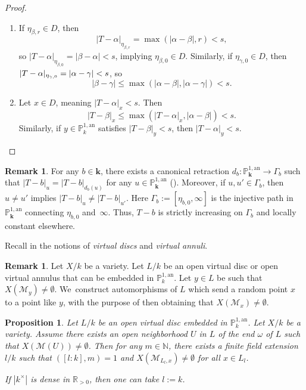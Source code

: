 \documentclass[JEP,XML,SOM,Unicode,NoFloatCountersInSection,published]{cedram}
\newcommand{\bbk}{{\boldsymbol{k}}}%
\newtheorem{prop}[thm]{Proposition}
\theoremstyle{definition}
\newtheorem{rem}[thm]{Remark}
\begin{document}
\pagebreak[2]
\skpt
\begin{proof}
\begin{enumerate}
\item
If $\eta_{\beta, r} \in D$, then
\[
|T-\alpha|_{\eta_{\beta, r}}=\max(|\alpha-\beta|, r)<s,
\]
so ${|T-\alpha|_{\eta_{\beta, 0}}=|\beta-\alpha|<s}$, implying $\eta_{\beta, 0} \in D$.
Similarly, if $\eta_{\gamma,0} \in D$, then $|T-\nobreak\alpha|_{\eta_{\gamma, 0}}=|\alpha-\gamma|<s$, so
\[
|\beta-\gamma|\leqslant \max(|\alpha-\beta|, |\alpha-\gamma|)<s.
\]

\item
Let $x \in D$, meaning $|T-\alpha|_x <s$. Then
\[
|T-\beta|_x \leqslant \max(|T-\alpha|_x, |\alpha-\beta|) <s.
\]
Similarly, if $y \in \mathbb{P}_{k}^{1, \mathrm{an}}$
satisfies $|T-\beta|_y < s$, then $|T-\alpha|_y<s$.\qedhere
\end{enumerate}
\end{proof}

\begin{rem} \label{5.2.1}
For any $b \in \bbk$, there exists a canonical retraction ${d_b: \mathbb{P}_{\bbk}^{1, \mathrm{an}} \to \Gamma_b}$ such that $|T-b|_{u}=|T-b|_{d_b(u)}$ for any $u \in \mathbb{P}_{\bbk}^{1, \mathrm{an}}$ (\cf \cite[3.4.24]{duc}). Moreover, if $u, u' \in \Gamma_b$, then $u \neq u'$ implies $|T-b|_u \neq |T-b|_{u'}$. Here $\Gamma_b:=[\eta_{b,0}, \infty]$ is the injective path in $\mathbb{P}_{\bbk}^{1, \mathrm{an}}$ connecting $\eta_{b,0}$ and~$\infty$.
Thus, $T-b$ is strictly increasing on $\Gamma_b$ and locally constant elsewhere.
\end{rem}

Recall in \cite[p.\,210]{duc} the notions of \emph{virtual discs} and \emph{virtual annuli}.

\begin{rem} \label{intro}
Let $X/k$ be a variety. Let $L/k$ be an open virtual disc or open virtual annulus that can be embedded in $\mathbb{P}_k^{1, \mathrm{an}}$. Let $y \in L$ be such that $X(\mathscr{M}_y) \neq \emptyset$.
We~construct automorphisms of $L$ which send a random point $x$ to a point like $y$, with the purpose of then obtaining that $X(\mathscr{M}_{x}) \neq \emptyset$.
\end{rem}

\begin{prop} \label{5.1}
Let $L/k$ be an open virtual disc embedded in $\mathbb{P}_k^{1, \mathrm{an}}$. Let $X/k$ be a variety. Assume there exists an open neighborhood $U$ in $L$ of the end $\omega$ of $L$ such that $X(\mathscr{M}(U)) \neq \emptyset$. Then for any $m \in \mathbb{N}$, there exists a finite field extension $l/k$ such that $([l:k], m)=1$ and $X(\mathscr{M}_{L_l, x}) \neq \emptyset$ for all $x \in L_l$.

If $|k^{\times}|$ is dense in $\mathbb{R}_{>0}$, then one can take $l:=k$.
\end{prop}
\end{document}

